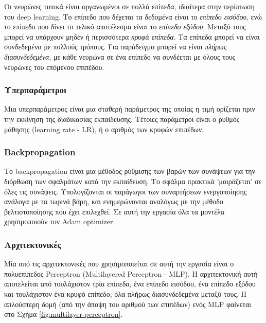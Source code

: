 Οι νευρώνες τυπικά είναι οργανωμένοι σε πολλά επίπεδα, ιδιαίτερα στην περίπτωση του deep learning. Το επίπεδο που δέχεται τα δεδομένα είναι το \textit{επίπεδο εισόδου}, ενώ το επίπεδο που δίνει το τελικό αποτέλεσμα είναι το \textit{επίπεδο εξόδου}. Μεταξύ τους μπορεί να υπάρχουν μηδέν ή περισσότερα \textit{κρυφά επίπεδα}. Τα επίπεδα μπορεί να είναι συνδεδεμένα με πολλούς τρόπους. Για παράδειγμα μπορεί να είναι \textit{πλήρως διασυνδεδεμένα}, με κάθε νευρώνα σε ένα επίπεδο να συνδέεται με όλους τους νευρώνες του επόμενου επιπέδου.

\subsubsection{Υπερπαράμετροι} \label{subsub:hyperparameters}

Μια υπερπαράμετρος είναι μια σταθερή παράμετρος της οποίας η τιμή ορίζεται πριν την εκκίνηση της διαδικασίας εκπαίδευσης. Τέτοιες παράμετροι είναι ο ρυθμός μάθησης (learning rate - LR), ή ο αριθμός των κρυφών επιπέδων.

\subsubsection{Backpropagation}

Το backpropagation είναι μια μέθοδος ρύθμισης των βαρών των συνάψεων για την διόρθωση των σφαλμάτων κατά την εκπαίδευση. Το σφάλμα πρακτικά 'μοιράζεται' σε όλες τις συνάψεις. Υπολογίζονται οι παράγωγοι των συναρτήσεων ενεργοποίησης ανάλογα με τα τωρινά βάρη, και ενημερώνονται αναλόγως με την μέθοδο βελτιστοποίησης που έχει επιλεχθεί. Σε αυτή την εργασία όλα τα μοντέλα χρησιμοποιούν τον Adam optimizer.

\subsubsection{Αρχιτεκτονικές}

Μία από τις αρχιτεκτονικές που χρησιμοποιείται σε αυτή την εργασία είναι ο πολυεπίπεδος Perceptron (Multilayered Perceptron - MLP). Η αρχιτεκτονική αυτή αποτελείται από τουλάχιστον τρία επίπεδα, ένα επίπεδο εισόδου, ένα επίπεδο εξόδου και τουλάχιστον ένα κρυφό επίπεδο, όλα πλήρως διασυνδεδεμένα μεταξύ τους. Η απλούστερη δομή (από την άποψη του αριθμού των επιπέδων) ενός MLP φαίνεται στο Σχήμα \ref{fig:multilayer-perceptron}.


